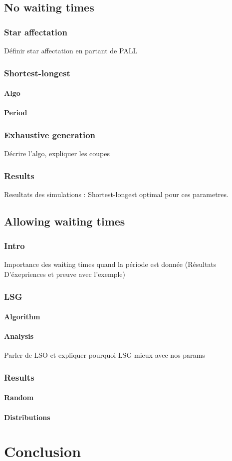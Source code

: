 \documentclass[a4paper,10pt]{article}
\begin{document}
  \subsection{No waiting times}
    \subsubsection{Star affectation}
      Définir star affectation en partant de PALL
    \subsubsection{Shortest-longest}
      \paragraph{Algo}
      \paragraph{Period}
    \subsubsection{Exhaustive generation}
      Décrire l'algo, expliquer les coupes
    \subsubsection{Results}
      Resultats des simulations : Shortest-longest optimal pour ces parametres.
      
   \subsection{Allowing waiting times}
     \subsubsection{Intro}
	Importance des waiting times quand la période est donnée (Résultats D'éxepriences et preuve avec l'exemple)
     \subsubsection{LSG}
	\paragraph{Algorithm}
	\paragraph{Analysis}
	  Parler de LSO et expliquer pourquoi LSG mieux avec nos params
     \subsubsection{Results}
	 \paragraph{Random}
	 \paragraph{Distributions}
   
\section{Conclusion}
\end{document}
